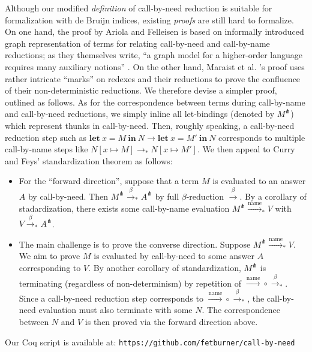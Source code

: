\documentclass{llncs}
\newcommand{\LET}[3]{\mathbf{let}~#1=#2~\mathbf{in}~#3}
\newcommand{\EXPANDLET}[1]{#1^\pitchfork}
\newcommand{\FULLBETA}{\xrightarrow{\beta}}
\newcommand{\CALLBYNAME}{\xrightarrow{\mathrm{name}}}
\newcommand{\RTCLOS}[1]{#1_*}
\begin{document}
Although our modified \emph{definition} of call-by-need reduction is suitable for formalization with de Bruijn indices, existing \emph{proofs} are still hard to formalize.  On one hand, the proof by Ariola and Felleisen \cite{Ariola97} is based on informally introduced graph representation of terms for relating call-by-need and call-by-name reductions; as they themselves write, ``a graph model for a higher-order language requires many auxiliary notions'' \cite[p. 3]{Ariola97}.  On the other hand, Maraist et al. \cite{Maraist98}'s proof uses rather intricate ``marks'' on redexes and their reductions to prove the confluence of their non-deterministic reductions.
We therefore devise a simpler proof, outlined as follows.  As for the correspondence between terms during call-by-name and call-by-need reductions, we simply inline all let-bindings (denoted by $\EXPANDLET{M}$) which represent thunks in call-by-need.  Then, roughly speaking, a call-by-need reduction step such as $\LET{x}{M}{N} \rightarrow \LET{x}{M'}{N}$ corresponds to multiple call-by-name steps like $N[x \mapsto M] \rightarrow_* N[x \mapsto M']$.  We then appeal to Curry and Feys' standardization theorem \cite{Barendregt-84} as follows:
\begin{itemize}
	\item For the ``forward direction'', suppose that a term $M$ is evaluated to an answer $A$ by call-by-need.  Then $\EXPANDLET{M}\RTCLOS{\FULLBETA}\EXPANDLET{A}$ by full $\beta$-reduction $\FULLBETA$.  By a corollary of stadardization, there exists some call-by-name evaluation $\EXPANDLET{M}\RTCLOS{\CALLBYNAME}V$ with $V\RTCLOS{\FULLBETA}\EXPANDLET{A}$.
	\item The main challenge is to prove the converse direction.  Suppose $\EXPANDLET{M} \RTCLOS{\CALLBYNAME}V$.  We aim to prove $M$ is evaluated by call-by-need to some answer $A$ corresponding to $V$.  By another corollary of standardization,
		$\EXPANDLET{M}$ is terminating (regardless of non-determinism) by repetition of ${\CALLBYNAME}\circ{\RTCLOS{\FULLBETA}}$.
		Since a call-by-need reduction step corresponds to ${\CALLBYNAME}\circ{\RTCLOS{\FULLBETA}}$, the call-by-need evaluation must also terminate with some $N$.
		The correspondence between $N$ and $V$ is then proved via the forward direction above.
\end{itemize}
%
Our Coq script is available at: \verb|https://github.com/fetburner/call-by-need|
\end{document}
